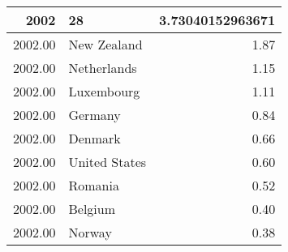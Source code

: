 \begin{table}[ht]
\centering
\begin{tabular}{rlr}
  \hline
2002 & 28 & 3.73040152963671 \\ 
  \hline
2002.00 & New Zealand & 1.87 \\ 
  2002.00 & Netherlands & 1.15 \\ 
  2002.00 & Luxembourg & 1.11 \\ 
  2002.00 & Germany & 0.84 \\ 
  2002.00 & Denmark & 0.66 \\ 
  2002.00 & United States & 0.60 \\ 
  2002.00 & Romania & 0.52 \\ 
  2002.00 & Belgium & 0.40 \\ 
  2002.00 & Norway & 0.38 \\ 
   \hline
\end{tabular}
\end{table}
